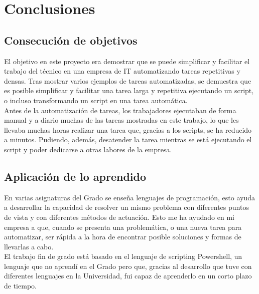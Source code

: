 \documentclass[a4paper, 12pt]{book}
\begin{document}

\cleardoublepage
\chapter{Conclusiones}
\label{chap:conclusiones}


\section{Consecución de objetivos}
\label{sec:consecucion-objetivos}

El objetivo en este proyecto era demostrar que se puede simplificar y facilitar el trabajo del técnico en una empresa de IT automatizando tareas repetitivas y densas. Tras mostrar varios ejemplos de tareas automatizadas, se demuestra que es posible simplificar y facilitar una tarea larga y repetitiva ejecutando un script, o incluso transformando un script en una tarea automática.
\\

Antes de la automatización de tareas, los trabajadores ejecutaban de forma manual y a diario muchas de las tareas mostradas en este trabajo, lo que les llevaba muchas horas realizar una tarea que, gracias a los scripts, se ha reducido a minutos. Pudiendo, además, desatender la tarea mientras se está ejecutando el script y poder dedicarse a otras labores de la empresa.


\section{Aplicación de lo aprendido}
\label{sec:aplicacion}

En varias asignaturas del Grado se enseña lenguajes de programación, esto ayuda a desarrollar la capacidad de resolver un mismo problema con diferentes puntos de vista y con diferentes métodos de actuación. Esto me ha ayudado en mi empresa a que, cuando se presenta una problemática, o una nueva tarea para automatizar, ser rápida a la hora de encontrar posible soluciones y formas de llevarlas a cabo.
\\

El trabajo fin de grado está basado en el lenguaje de scripting Powershell, un lenguaje que no aprendí en el Grado pero que, gracias al desarrollo que tuve con diferentes lenguajes en la Universidad, fui capaz de aprenderlo en un corto plazo de tiempo.
\end{document}
